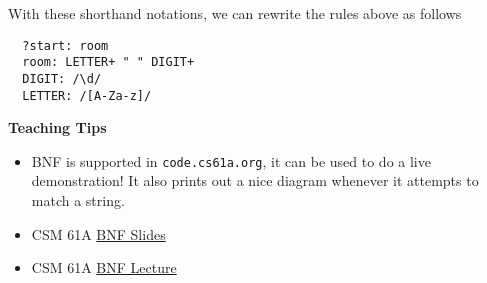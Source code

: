 With these shorthand notations, we can rewrite the rules above as follows
\begin{lstlisting}
  ?start: room
  room: LETTER+ " " DIGIT+
  DIGIT: /\d/
  LETTER: /[A-Za-z]/
\end{lstlisting}


\begin{guide}
  \begin{blocksection}
    \textbf{Teaching Tips}
    \begin{itemize}
      \item BNF is supported in \lstinline{code.cs61a.org}, it can be used to do a live demonstration! It also prints out a nice diagram whenever it attempts to match a string. 
      \item CSM 61A \href{https://docs.google.com/presentation/d/1keFq3PT0mqvt-rbvGVhBMlwlNf6khhgUELL4wZCHRyA/edit?usp=sharing}{BNF Slides}
      \item CSM 61A \href{https://berkeley.zoom.us/rec/share/f3mT6LPTH-_aL1EUg782aL-ekcf7VP4bkWR3OjtGlwEH75WAPpzyraYdgb2t5eDa.fitGMZt2--fKl86v?startTime=1636413684000}{BNF Lecture}
    \end{itemize}
  \end{blocksection}
\end{guide}